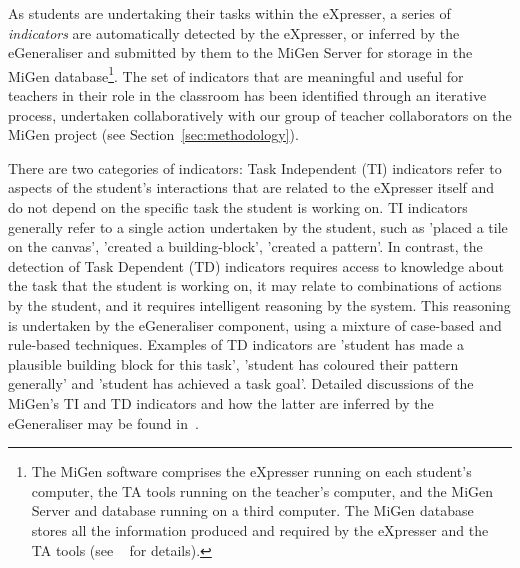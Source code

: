 
As students are undertaking their tasks within the eXpresser, a series
of {\em indicators} are automatically detected by the eXpresser, or
inferred by the eGeneraliser and submitted by them to the MiGen
Server for storage in the MiGen database\footnote{The MiGen software
  comprises the eXpresser running on each student’s computer, the TA
  tools running on the teacher’s computer, and the MiGen Server and
  database running on a third computer. The MiGen database stores all
  the information produced and required by the eXpresser and the TA
  tools (see ~\cite{MiGen-CAE,IEEE-TLT-TA} for details).}.   
The set of indicators that are meaningful and useful for teachers in
their role in the classroom has been identified through an iterative
process, undertaken collaboratively with our group of teacher
collaborators on the MiGen project (see Section~\ref{sec:methodology}).  

There are two categories of indicators: Task Independent (TI)
indicators refer to aspects of the student's interactions that are
related to the eXpresser itself and do not depend on the specific task
the student is working on. TI indicators generally refer to a single
action undertaken by the student, such as 'placed a tile on the
canvas', 'created a building-block', 'created a pattern'. In contrast,
the detection of Task Dependent (TD) indicators requires access to
knowledge about the task that the student is working on, it may relate
to combinations of actions by the student, and it requires intelligent
reasoning by the system. This reasoning is undertaken by the
eGeneraliser component, using a mixture of case-based and rule-based
techniques. Examples of TD indicators are 'student has made a
plausible building block for this task', 'student has coloured their
pattern generally' and 'student has achieved a task goal'. Detailed
discussions of the MiGen's TI and TD indicators and how the latter are
inferred by the eGeneraliser may be found in~\cite{IEEE-TLT-TA}.
 
